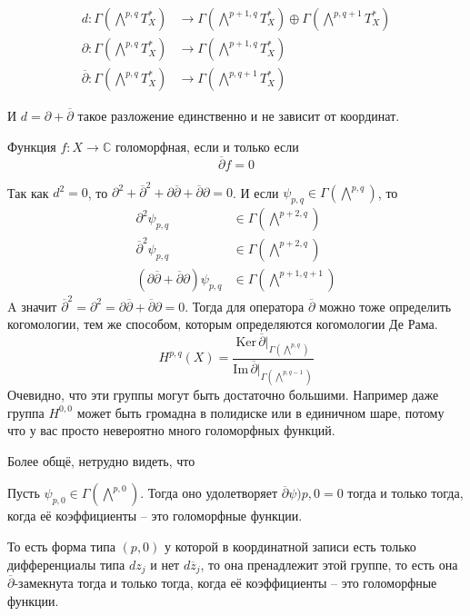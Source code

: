 \utv
\begin{align*}
    d:\Gamma\left(\bigwedge^{p,q}T^*_X\right)&\rightarrow\Gamma\left(\bigwedge^{p+1,q}T^*_X\right)\oplus
\Gamma\left(\bigwedge^{p,q+1}T^*_X\right)\\
    \partial:\Gamma\left(\bigwedge^{p,q}T^*_X\right)&\rightarrow\Gamma\left(\bigwedge^{p+1,q}T^*_X\right)\\
    \overline\partial:\Gamma\left(\bigwedge^{p,q}T^*_X\right)&\rightarrow\Gamma\left(\bigwedge^{p,q+1}T^*_X\right)
\end{align*}

И $d=\partial+\overline\partial$ такое разложение единственно и не зависит от координат.

\sled Функция $f:X\rightarrow\mathbb C$ голоморфная, если и только
если 
\[\overline\partial f=0\]

Так как $d^2=0$, то $\partial^2+\overline\partial^2+\partial\overline\partial+
\overline\partial\partial=0$. И если $\psi_{p,q}\in\Gamma(\bigwedge^{p,q})$, то
\begin{align*}
    \partial^2\psi_{p,q}&\in\Gamma\left(\bigwedge^{p+2,q}\right)\\
    \overline\partial^2\psi_{p,q}&\in\Gamma\left(\bigwedge^{p+2,q}\right)\\
    (\partial\overline\partial+\overline\partial\partial)\psi_{p,q}&\in\Gamma\left(
    \bigwedge^{p+1,q+1}\right)
\end{align*}
A значит $\overline\partial^2=\partial^2=\partial\overline\partial+\overline\partial
\partial=0$. Тогда для оператора $\overline\partial$ можно тоже определить
когомологии, тем же способом, которым определяются когомологии Де Рама.
\[H^{p,q}(X)=\frac{\text{Ker}\,\overline\partial|_{\Gamma\left(\bigwedge^{p,q}\right)}}{\text{Im}\,
\overline\partial|_{\Gamma\left(\bigwedge^{p,q-1}\right)}}\]
Очевидно, что эти группы могут быть достаточно большими. Например даже группа
$H^{0,0}$ может быть громадна в полидиске или в единичном шаре, потому что у
вас просто невероятно много голоморфных функций.

Более общё, нетрудно видеть, что

\utv Пусть $\psi_{p,0}\in\Gamma\left(\bigwedge^{p,0}\right)$. Тогда оно
удолетворяет $\overline\partial\psi){p,0}=0$ тогда и только тогда, когда
её коэффициенты – это голоморфные функции.

То есть форма типа $(p,0)$ у которой в координатной записи есть только
дифференциалы типа $dz_j$ и нет $d\overline z_j$, то она пренадлежит
этой группе, то есть она $\overline\partial$-замекнута тогда и только тогда,
когда её коэффициенты – это голоморфные функции.

